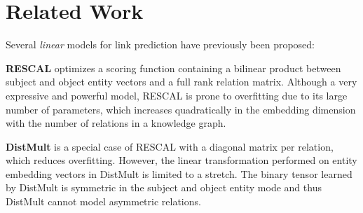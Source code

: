 \documentclass[11pt,a4paper]{article}
\begin{document}
\section{Related Work} \label{relwork}

\begin{table*}[!t]
\centering
{}
  \caption{Scoring functions of state-of-the-art link prediction models, the dimensionality of their relation parameters, and significant terms of their space complexity.  and  are the dimensionalities of entity and relation embeddings, while  and  denote the number of entities and relations respectively.  is the complex conjugate of ,  denote a 2D reshaping of  and  respectively,  are the head and tail entity embedding of entity , and  is the embedding of relation  (which is the inverse of relation ).  is the convolution operator,  denotes the dot product and  denotes the tensor product along the -th mode,  is a non-linear function, and  is the core tensor of a Tucker decomposition.}
  \label{table:models}
\end{table*}

Several \textit{linear} models for link prediction have previously been proposed:

\noindent\textbf{RESCAL} \cite{nickel2011three} optimizes a scoring function containing a bilinear product between subject and object entity vectors and a full rank relation matrix. Although a very expressive and powerful model, RESCAL is prone to overfitting due to its large number of parameters, which increases quadratically in the embedding dimension with the number of relations in a knowledge graph. 

\noindent\textbf{DistMult} \cite{yang2014embedding} is a special case of RESCAL with a diagonal matrix per relation, which reduces overfitting. However, the linear transformation performed on entity embedding vectors in DistMult is limited to a stretch. The binary tensor learned by DistMult is symmetric in the subject and object entity mode and thus DistMult cannot model asymmetric relations. 
\end{document}
